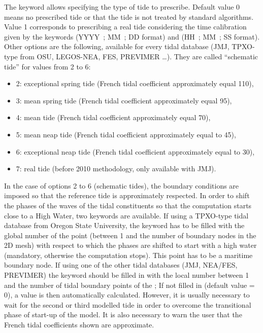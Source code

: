 The keyword  allows specifying
the type of tide to prescribe.
Default value 0 means no prescribed tide or that the tide is not treated by
standard algorithms.
Value 1 corresponds to prescribing a real tide considering the time calibration
given by the keywords  (YYYY~; MM~; DD format) and
 (HH~; MM~; SS format).
Other options are the following, available for every tidal database (JMJ,
TPXO-type from OSU, LEGOS-NEA, FES, PREVIMER \ldots).
They are called “schematic tide” for values from 2 to 6:

\begin{itemize}
\item 2: exceptional spring tide (French tidal coefficient
 approximately equal 110),

\item 3: mean spring tide (French tidal coefficient approximately
 equal 95),

\item 4: mean tide (French tidal coefficient approximately equal 70),

\item 5: mean neap tide (French tidal coefficient approximately
equal to 45),

\item 6: exceptional neap tide (French tidal coefficient
approximately equal to 30),

\item 7: real tide (before 2010 methodology, only available
with JMJ).
\end{itemize}

In the case of options 2 to 6 (schematic tides), the boundary conditions are
imposed so that the reference tide is approximately respected.
In order to shift the phases of the waves of the tidal constituents so that
the computation starts close to a High Water, two keywords are available.
If using a TPXO-type tidal database from Oregon State University, the keyword
 has to be filled
with the global number of the point (between 1 and the number of boundary
nodes in the 2D mesh) with respect to which the phases are shifted
to start with a high water (mandatory, otherwise the computation stops).
This point has to be a maritime boundary node.
If using one of the other tidal databases (JMJ, NEA/FES, PREVIMER) the keyword
 should be filled in
with the local number between 1 and the number of tidal boundary points of the
; If not filled in (default value = 0), a value
is then automatically calculated.
However, it is usually necessary to wait for the second or third modelled tide
in order to overcome the transitional phase of start-up of the model.
It is also necessary to warn the user that the French tidal coefficients shown
are approximate.


